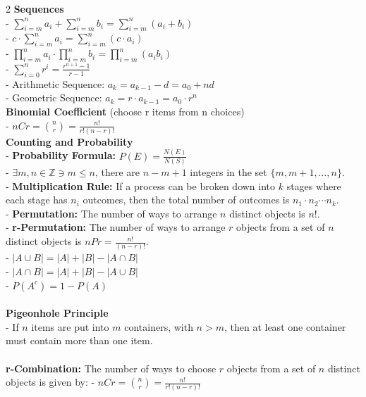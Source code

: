 \documentclass[10pt,letterpaper]{article}
\begin{document}
\begin{multicols}{2}
\textbf{Sequences}\\
- $\sum_{i=m}^{n} a_i + \sum_{i=m}^{n} b_i = \sum_{i=m}^{n}(a_i + b_i)$\\
- $c \cdot \sum_{i=m}^{n} a_i = \sum_{i=m}^{n}(c \cdot a_i)$\\
- $\prod_{i=m}^{n} a_i \cdot \prod_{i=m}^{n} b_i = \prod_{i=m}^{n}(a_ib_i)$\\
- $\sum_{i=0}^{n} r^i = \frac{r^{n+1} - 1}{r - 1}$\\
- Arithmetic Sequence: $a_k = a_{k-1} - d = a_0 + nd$\\
- Geometric Sequence: $a_k = r \cdot a_{k-1} = a_0 \cdot r^n$\\
\textbf{Binomial Coefficient} (choose r items from n choices)\\
- $nCr = \binom{n}{r} = \frac{n!}{r!(n-r)!}$\\

\textbf{Counting and Probability}\\
- \textbf{Probability Formula:} $P(E) = \frac{N(E)}{N(S)}$ \\
- $\exists m, n \in \mathbb{Z} \ni m \leq n$, there are $n - m + 1$ integers in the set $\{m, m+1, \dots, n\}$.\\
- \textbf{Multiplication Rule:} If a process can be broken down into $k$ stages where each stage has $n_i$ outcomes,
then the total number of outcomes is $n_1 \cdot n_2 \cdots n_k$.\\
- \textbf{Permutation:} The number of ways to arrange $n$ distinct objects is $n!$.\\
- \textbf{r-Permutation:} The number of ways to arrange $r$ objects from a set of $n$ distinct objects is $nPr = \frac{n!}{(n-r)!}$.\\
- $|A \cup B| = |A| + |B| - |A \cap B|$\\
- $|A \cap B| = |A| + |B| - |A \cup B|$\\
- $P(A^c) = 1 - P(A)$\\
\\
\textbf{Pigeonhole Principle}\\
- If $n$ items are put into $m$ containers, with $n > m$, then at least one container must contain more than one item.\\
\\
\textbf{r-Combination:} The number of ways to choose $r$ objects from a set of $n$ distinct objects is given by:
- $nCr = \binom{n}{r} = \frac{n!}{r!(n-r)!}$\\

\vspace{9999pt}

\end{multicols}
\end{document}
